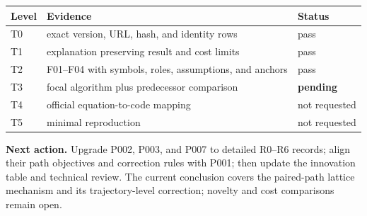 \documentclass[10pt]{article}
\newcommand{\status}[1]{\textcolor{rose}{\textbf{#1}}}
\begin{document}
\begin{tabularx}{\linewidth}{@{}P{1cm}Y P{2.4cm}@{}}
\toprule
Level & Evidence & Status \\
\midrule
T0 & exact version, URL, hash, and identity rows & pass \\
T1 & explanation preserving result and cost limits & pass \\
T2 & F01--F04 with symbols, roles, assumptions, and anchors & pass \\
T3 & focal algorithm plus predecessor comparison & \status{pending} \\
T4 & official equation-to-code mapping & not requested \\
T5 & minimal reproduction & not requested \\
\bottomrule
\end{tabularx}

\medskip
\noindent\textbf{Next action.} Upgrade P002, P003, and P007 to detailed R0--R6
records; align their path objectives and correction rules with P001; then update
the innovation table and technical review. The current conclusion covers the
paired-path lattice mechanism and its trajectory-level correction; novelty and
cost comparisons remain open.
\end{document}
